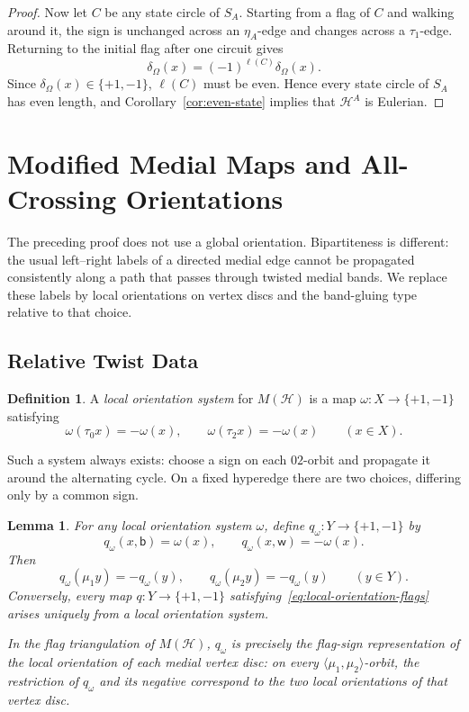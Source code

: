\documentclass{article}
\newtheorem{lemma}[theorem]{Lemma}
\theoremstyle{definition}
\newtheorem{definition}[theorem]{Definition}
\theoremstyle{remark}
\newcommand{\Hcal}{\mathcal{H}}
\begin{document}
\begin{proof}
Now let $C$ be any state circle of $S_A$. Starting from a flag of $C$ and walking around it, the sign is unchanged across an $\eta_A$-edge and changes across a $\tau_1$-edge. Returning to the initial flag after one circuit gives
\[
  \delta_\Omega(x)=(-1)^{\ell(C)}\delta_\Omega(x).
\]
Since $\delta_\Omega(x)\in\{+1,-1\}$, $\ell(C)$ must be even. Hence every state circle of $S_A$ has even length, and Corollary~\ref{cor:even-state} implies that $\Hcal^A$ is Eulerian.
\end{proof}

\section{Modified Medial Maps and All-Crossing Orientations}

The preceding proof does not use a global orientation. Bipartiteness is different: the usual left--right labels of a directed medial edge cannot be propagated consistently along a path that passes through twisted medial bands. We replace these labels by local orientations on vertex discs and the band-gluing type relative to that choice.

\subsection{Relative Twist Data}

\begin{definition}\label{def:local-orientation}
A \emph{local orientation system} for $M(\Hcal)$ is a map $\omega:X\to\{+1,-1\}$ satisfying
\[
 \omega(\tau_0x)=-\omega(x),\qquad \omega(\tau_2x)=-\omega(x)
 \qquad (x\in X).
\]
\end{definition}

Such a system always exists: choose a sign on each $02$-orbit and propagate it around the alternating cycle. On a fixed hyperedge there are two choices, differing only by a common sign.

\begin{lemma}\label{lem:local-orientation-flags}
For any local orientation system $\omega$, define $q_\omega:Y\to\{+1,-1\}$ by
\[
  q_\omega(x,\mathsf b)=\omega(x),\qquad
  q_\omega(x,\mathsf w)=-\omega(x).
\]
Then
\[
  q_\omega(\mu_1y)=-q_\omega(y),\qquad
  q_\omega(\mu_2y)=-q_\omega(y)\qquad(y\in Y). \tag{L}\label{eq:local-orientation-flags}
\]
Conversely, every map $q:Y\to\{+1,-1\}$ satisfying~\eqref{eq:local-orientation-flags} arises uniquely from a local orientation system.

In the flag triangulation of $M(\Hcal)$, $q_\omega$ is precisely the flag-sign representation of the local orientation of each medial vertex disc: on every $\langle\mu_1,\mu_2\rangle$-orbit, the restriction of $q_\omega$ and its negative correspond to the two local orientations of that vertex disc.
\end{lemma}
\end{document}
